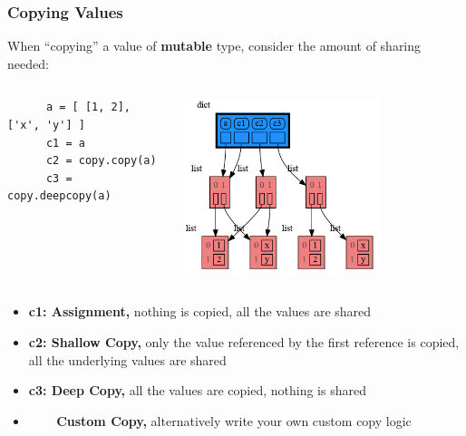 \documentclass[10pt, colorlinks=true, urlcolor=blue]{beamer}
\begin{document}
\begin{frame}[fragile]
  \frametitle{Copying Values}
  When ``copying'' a value of \textbf{mutable} type, consider the amount of sharing needed:
  \vspace{-1em}
\begin{columns}
  \begin{verbatim}
      a = [ [1, 2], ['x', 'y'] ]
      c1 = a
      c2 = copy.copy(a)
      c3 = copy.deepcopy(a)
    \end{verbatim}
    \begin{center}\includegraphics[width=0.7\textwidth]{figures/copy.png}\end{center}
\end{columns}
    \begin{itemize}
        \item \textbf{c1: Assignment,} nothing is copied, all the values are shared
        \item \textbf{c2: Shallow Copy,} only the value referenced by the first reference is copied, all the underlying values are shared
        \item \textbf{c3: Deep Copy,} all the values are copied, nothing is shared
        \item \ \ \, \,\, \textbf{Custom Copy,} alternatively write your own custom copy logic
    \end{itemize}
\end{frame}
\end{document}
